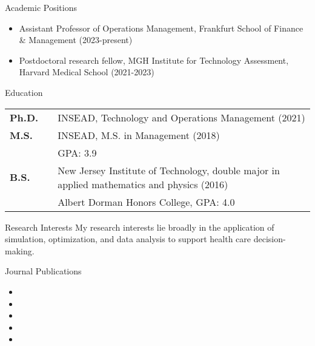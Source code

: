 \documentclass{resume}
\begin{document}


\begin{rSection}{Academic Positions}
  \begin{itemize}
    \item Assistant Professor of Operations Management, Frankfurt School of Finance \& Management (2023-present)
    \item Postdoctoral research fellow, MGH Institute for Technology Assessment, Harvard Medical School (2021-2023)
  \end{itemize}
\end{rSection}


\begin{rSection}{Education}

\begin{tabular}{lll}
\textbf{Ph.D.} & & INSEAD, Technology and Operations Management (2021)\\
\textbf{M.S.} & & INSEAD, M.S. in Management (2018)\\
& & GPA: 3.9\\
\textbf{B.S.} & & New Jersey Institute of Technology, double major in applied mathematics and physics (2016)\\
& & Albert Dorman Honors College, GPA: 4.0
\end{tabular}

\end{rSection}

\begin{rSection}{Research Interests}
My research interests lie broadly in the application of simulation, optimization, and data analysis to support health care decision-making.
\end{rSection}

\begin{rSection}{Journal Publications}
\begin{itemize}
\item {}
\item {}
\item {}
\item {}
\item {}
\end{itemize}
\end{rSection}
\end{document}
